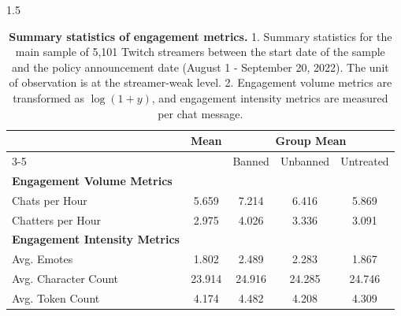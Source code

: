 \documentclass[a4paper,12pt]{article}
\begin{document}
\begin{spacing}{1.5}
\begin{table}[!htb]
\renewcommand{\arraystretch}{1.2}
\centering
\begin{threeparttable}
\begin{tabular}{lcccc}
\hline
\multirow{2}{*}{}              & \multirow{2}{*}{Mean} & \multicolumn{3}{c}{Group Mean}                                                            \\ \cline{3-5} 
                               &                       & \multicolumn{1}{l}{Banned} & \multicolumn{1}{l}{Unbanned} & \multicolumn{1}{l}{Untreated} \\ \hline
\textbf{Engagement Volume Metrics} & \multicolumn{1}{l}{}  & \multicolumn{1}{l}{}       & \multicolumn{1}{l}{}         & \multicolumn{1}{l}{}          \\
Chats per Hour                & 5.659                 & 7.214                      & 6.416                        & 5.869                         \\
Chatters per Hour             & 2.975                 & 4.026                      & 3.336                        & 3.091                         \\
\textbf{Engagement Intensity Metrics} &                       &                            &                              &                               \\
Avg. Emotes            & 1.802                 & 2.489                      & 2.283                        & 1.867                         \\
Avg. Character Count            & 23.914                 & 24.916                      & 24.285                        & 24.746                         \\
Avg. Token Count            & 4.174                 & 4.482                      & 4.208                        & 4.309                         \\ \hline
\end{tabular}
\end{threeparttable}
\small
\vspace{0.5em}
\caption{\small \textbf{Summary statistics of engagement metrics.} 1. Summary statistics for the main sample of 5,101 Twitch streamers between the start date of the sample and the policy announcement date (August 1 - September 20, 2022). The unit of observation is at the streamer-weak level. 2. Engagement volume metrics are transformed as $\log(1+y)$, and engagement intensity metrics are measured per chat message.}
\label{table-summary-engagement}
\end{table}


\end{spacing}
\end{document}
